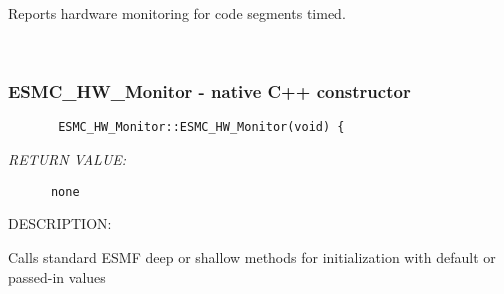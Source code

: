         Reports hardware monitoring for code segments timed.
   
 
\mbox{}\hrulefill\ 
 
\subsubsection{ESMC\_HW\_Monitor - native C++ constructor}


  
\begin{verbatim}       ESMC_HW_Monitor::ESMC_HW_Monitor(void) {\end{verbatim}{\em RETURN VALUE:}
\begin{verbatim}      none\end{verbatim}
{\sf DESCRIPTION:\\ }


        Calls standard ESMF deep or shallow methods for initialization
        with default or passed-in values
  
